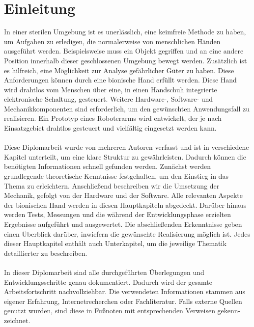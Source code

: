 \documentclass[titlepage,12pt,twoside]{article}
\begin{document}
\thispagestyle{empty}

\newpage


\tableofcontents


\clearpage
{}

\section{Einleitung}
\label{chap:Einleitung}
In einer sterilen Umgebung ist es unerlässlich, eine keimfreie Methode zu haben, um Aufgaben zu erledigen, die normalerweise von 
menschlichen Händen ausgeführt werden. Beispielsweise muss ein Objekt gegriffen und an eine andere Position innerhalb dieser 
geschlossenen Umgebung bewegt werden. Zusätzlich ist es hilfreich, eine Möglichkeit zur Analyse gefährlicher Güter zu haben.
Diese Anforderungen können durch eine bionische Hand erfüllt werden. Diese Hand wird drahtlos vom Menschen über eine, in einen 
Handschuh integrierte elektronische Schaltung, gesteuert. Weitere Hardware-, Software- und Mechanikkomponenten sind erforderlich, 
um den gewünschten Anwendungsfall zu realisieren. Ein Prototyp eines Roboterarms wird entwickelt, der je nach Einsatzgebiet 
drahtlos gesteuert und vielfältig eingesetzt werden kann. \\
\\
Diese Diplomarbeit wurde von mehreren Autoren verfasst und ist in verschiedene Kapitel unterteilt, um eine klare Struktur zu 
gewährleisten. Dadurch können die benötigten Informationen schnell gefunden werden. Zunächst werden grundlegende theoretische 
Kenntnisse festgehalten, um den Einstieg in das Thema zu erleichtern. Anschließend beschreiben wir die Umsetzung der Mechanik, 
gefolgt von der Hardware und der Software. Alle relevanten Aspekte der bionischen Hand werden in diesen Hauptkapiteln abgedeckt. 
Darüber hinaus werden Tests, Messungen und die während der Entwicklungsphase erzielten Ergebnisse aufgeführt und ausgewertet. Die 
abschließenden Erkenntnisse geben einen Überblick darüber, inwiefern die gewünschte Realisierung möglich ist. Jedes dieser 
Hauptkapitel enthält auch Unterkapitel, um die jeweilige Thematik detaillierter zu beschreiben. \\
\\
In dieser Diplomarbeit sind alle durchgeführten Überlegungen und Entwicklungsschritte genau dokumentiert. Dadurch wird der gesamte 
Arbeitsfortschritt nachvollziehbar. Die verwendeten Informationen stammen aus eigener Erfahrung, Internetrecherchen oder 
Fachliteratur. Falls externe Quellen genutzt wurden, sind diese in Fußnoten mit entsprechenden Verweisen gekenn- \\zeichnet. \\
\\
\end{document}
